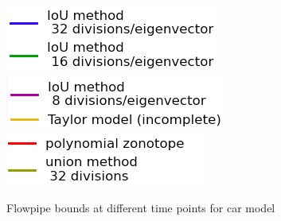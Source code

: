 \begin{figure}
\includegraphics[scale = 0.39]{autocarImages/leg1.png}~
  \includegraphics[scale = 0.41]{autocarImages/leg2.png}~
  \includegraphics[scale = 0.41]{autocarImages/leg3.png}
  \caption{Flowpipe bounds at different time points for
    car model}\label{fig:flowcar}
\end{figure}

%
